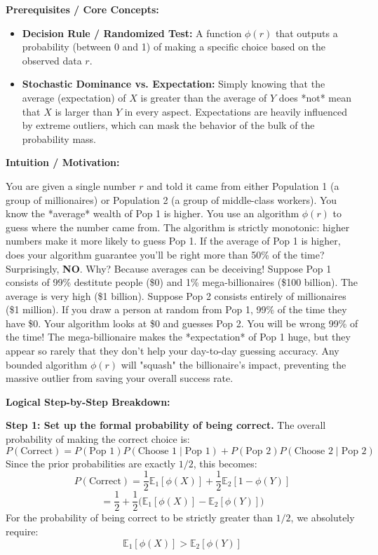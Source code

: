 \begin{solution}
\textbf{Prerequisites / Core Concepts:}
\begin{itemize}
    \item \textbf{Decision Rule / Randomized Test:} A function $\phi(r)$ that outputs a probability (between 0 and 1) of making a specific choice based on the observed data $r$.
    \item \textbf{Stochastic Dominance vs. Expectation:} Simply knowing that the average (expectation) of $X$ is greater than the average of $Y$ does *not* mean that $X$ is larger than $Y$ in every aspect. Expectations are heavily influenced by extreme outliers, which can mask the behavior of the bulk of the probability mass.
\end{itemize}

\textbf{Intuition / Motivation:}

You are given a single number $r$ and told it came from either Population 1 (a group of millionaires) or Population 2 (a group of middle-class workers). You know the *average* wealth of Pop 1 is higher.
You use an algorithm $\phi(r)$ to guess where the number came from. The algorithm is strictly monotonic: higher numbers make it more likely to guess Pop 1.
If the average of Pop 1 is higher, does your algorithm guarantee you'll be right more than 50\% of the time?
Surprisingly, \textbf{NO}.
Why? Because averages can be deceiving! Suppose Pop 1 consists of 99\% destitute people (\$0) and 1\% mega-billionaires (\$100 billion). The average is very high (\$1 billion).
Suppose Pop 2 consists entirely of millionaires (\$1 million).
If you draw a person at random from Pop 1, 99\% of the time they have \$0. Your algorithm looks at \$0 and guesses Pop 2. You will be wrong 99\% of the time! The mega-billionaire makes the *expectation* of Pop 1 huge, but they appear so rarely that they don't help your day-to-day guessing accuracy. Any bounded algorithm $\phi(r)$ will "squash" the billionaire's impact, preventing the massive outlier from saving your overall success rate.

\textbf{Logical Step-by-Step Breakdown:}

\textbf{Step 1: Set up the formal probability of being correct.}
The overall probability of making the correct choice is:
\[ P(\text{Correct}) = P(\text{Pop 1}) P(\text{Choose 1} \mid \text{Pop 1}) + P(\text{Pop 2}) P(\text{Choose 2} \mid \text{Pop 2}) \]
Since the prior probabilities are exactly $1/2$, this becomes:
\[ P(\text{Correct}) = \frac{1}{2} \mathbb{E}_1[\phi(X)] + \frac{1}{2} \mathbb{E}_2[1 - \phi(Y)] \]
\[ = \frac{1}{2} + \frac{1}{2} \Big( \mathbb{E}_1[\phi(X)] - \mathbb{E}_2[\phi(Y)] \Big) \]
For the probability of being correct to be strictly greater than $1/2$, we absolutely require:
\[ \mathbb{E}_1[\phi(X)] > \mathbb{E}_2[\phi(Y)] \]


\end{solution}
